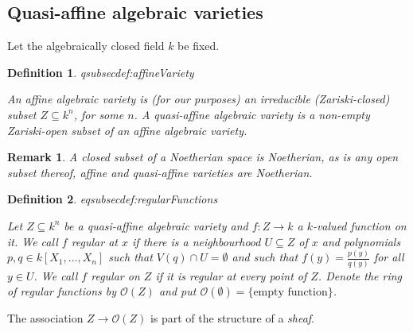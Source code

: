 \documentclass[DIV=14,parskip=full,pointednumbers]{scrartcl}
\theoremstyle{cthm}
\theoremstyle{cvarthm}
\theoremstyle{cdef}
\newtheorem{defi}{Definition}[subsection]
\newtheorem{rem}{Remark}[subsection]
\newcommand{\lbl}[1]{
	\label{#1}
	\ifmmode
	\expandafter\xdef\csname eqsubsec#1\endcsname{\thesubsection}
	\fi
}
\newcommand{\Oo}{\mathcal{O}}
\begin{document}
	\subsection{Quasi-affine algebraic varieties}
	Let the algebraically closed field $k$ be fixed.
	\begin{defi}\lbl{def:affineVariety}
		An \emph{affine algebraic variety} is (for our purposes) an irreducible (Zariski-closed) subset $Z\subseteq k^n$, for some $n$. A \emph{quasi-affine algebraic variety} is a non-empty Zariski-open subset of an affine algebraic variety.
	\end{defi}
	\begin{rem}
		A closed subset of a Noetherian space is Noetherian, as is any open subset thereof, affine and quasi-affine varieties are Noetherian.
	\end{rem}
	\begin{defi}\lbl{def:regularFunctions}
		Let $Z\subseteq k^n$ be a quasi-affine algebraic variety and $f: Z\to k$ a $k$-valued function on it. We call $f$ \emph{regular at $x$} if there is a neighbourhood $U\subseteq Z$ of $x$ and polynomials $p,q\in k[X_1,\ldots,X_n]$ such that $V(q) \cap U = \emptyset$ and such that $f(y) = \frac{p(y)}{q(y)}$ for all $y\in U$. We call $f$ \emph{regular} on $Z$ if it is regular at every point of $Z$. Denote the ring of regular functions by $\Oo(Z)$ and put $\Oo(\emptyset)=\{\text{empty function}\}$.
	\end{defi}
	The association $Z\to \Oo(Z)$ is part of the structure of a \emph{sheaf}.
\end{document}
